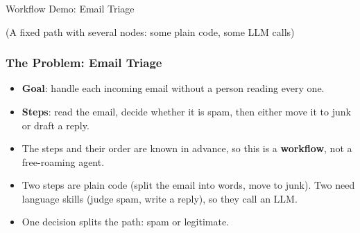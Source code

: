 \begin{frame}[fragile]\frametitle{}
\begin{center}
{\Large Workflow Demo: Email Triage}

{\tiny (A fixed path with several nodes: some plain code, some LLM calls)}
\end{center}
\end{frame}

\begin{frame}[fragile]\frametitle{The Problem: Email Triage}
      \begin{itemize}
        \item \textbf{Goal}: handle each incoming email without a person reading every one.
        \item \textbf{Steps}: read the email, decide whether it is spam, then either move it to junk or draft a reply.
        \item The steps and their order are known in advance, so this is a \textbf{workflow}, not a free-roaming agent.
        \item Two steps are plain code (split the email into words, move to junk). Two need language skills (judge spam, write a reply), so they call an LLM.
        \item One decision splits the path: spam or legitimate.
      \end{itemize}
\end{frame}

